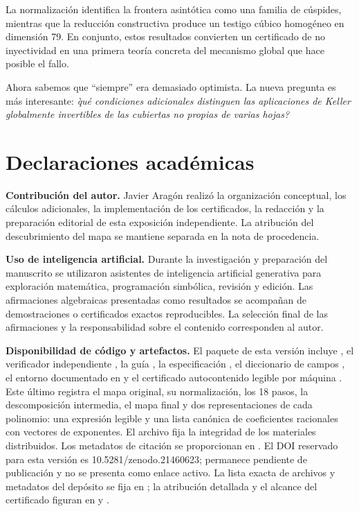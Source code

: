 \documentclass[11pt]{article}
\newcommand{\paperdoi}{10.5281/zenodo.21460623}
\theoremstyle{definition}
\theoremstyle{remark}
\begin{document}
La normalizaci\'on identifica la frontera asint\'otica como una familia de
c\'uspides, mientras que la reducci\'on constructiva produce un testigo c\'ubico
homog\'eneo en dimensi\'on 79. En conjunto, estos resultados convierten un
certificado de no inyectividad en una primera teor\'ia concreta del mecanismo
global que hace posible el fallo.

Ahora sabemos que ``siempre'' era demasiado optimista. La nueva pregunta es
m\'as interesante: \emph{\`qu\'e condiciones adicionales distinguen las
aplicaciones de Keller globalmente invertibles de las cubiertas no propias de
varias hojas?}

\section*{Declaraciones acad\'emicas}

\textbf{Contribuci\'on del autor.}
Javier Arag\'on realiz\'o la organizaci\'on conceptual, los c\'alculos
adicionales, la implementaci\'on de los certificados, la redacci\'on y la
preparaci\'on editorial de esta exposici\'on independiente. La atribuci\'on del
descubrimiento del mapa se mantiene separada en la nota de procedencia.

\textbf{Uso de inteligencia artificial.}
Durante la investigaci\'on y preparaci\'on del manuscrito se utilizaron
asistentes de inteligencia artificial generativa para exploraci\'on
matem\'atica, programaci\'on simb\'olica, revisi\'on y edici\'on. Las
afirmaciones algebraicas presentadas como resultados se acompa\~nan de
demostraciones o certificados exactos reproducibles. La selecci\'on final de
las afirmaciones y la responsabilidad sobre el contenido corresponden al
autor.

\textbf{Disponibilidad de c\'odigo y artefactos.}
El paquete de esta versi\'on incluye
, el verificador independiente
, la gu\'ia
, la especificaci\'on
, el diccionario de campos
, el entorno documentado en
 y el certificado autocontenido legible por m\'aquina
. Este \'ultimo registra el mapa
original, su normalizaci\'on, los 18 pasos, la descomposici\'on intermedia, el
mapa final y dos representaciones de cada polinomio: una expresi\'on legible y
una lista can\'onica de coeficientes racionales con vectores de exponentes. El
archivo
 fija la integridad de los materiales distribuidos.
Los metadatos de citaci\'on se proporcionan en . El DOI
reservado para esta versi\'on es \paperdoi; permanece pendiente de publicaci\'on
y no se presenta como enlace activo. La lista exacta de archivos y metadatos
del dep\'osito se fija en ; la atribuci\'on detallada y
el alcance del certificado figuran en  y
.
\end{document}
